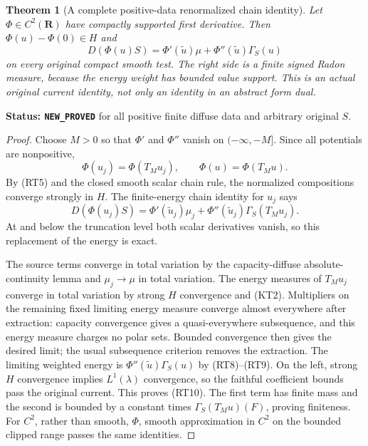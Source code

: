 \documentclass[11pt,a4paper]{article}
\numberwithin{equation}{section}
\newtheorem{theorem}{Theorem}[section]
\theoremstyle{definition}
\theoremstyle{remark}
\begin{document}
\begin{theorem}[A complete positive-data renormalized chain identity]
\label{thm:r11-positive-diffuse-renormalized-chain}
Let $\Phi\in C^2(\mathbf R)$ have compactly supported first
derivative.  Then $\Phi(u)-\Phi(0)\in H$ and
\[
 D(\Phi(u)S)
     =\Phi'(\widetilde u)\mu
                        +\Phi''(\widetilde u)\Gamma_S(u)
 \tag{RT10}
\]
on every original compact smooth test.  The right side is a
finite signed Radon measure, because the energy weight has
bounded value support.  This is an actual original current
identity, not only an identity in an abstract form dual.
\end{theorem}

\noindent\textbf{Status: \texttt{NEW\_PROVED}} for all positive
finite diffuse data and arbitrary original $S$.

\begin{proof}
Choose $M>0$ so that $\Phi'$ and $\Phi''$ vanish on
$(-\infty,-M]$.  Since all potentials are nonpositive,
\[
             \Phi(u_j)=\Phi(T_Mu_j),\qquad
             \Phi(u)=\Phi(T_Mu).
\]
By (RT5) and the closed smooth scalar chain rule, the
normalized compositions converge strongly in $H$.
The finite-energy chain identity for $u_j$ says
\[
 D(\Phi(u_j)S)=\Phi'(\widetilde u_j)\mu_j
                   +\Phi''(\widetilde u_j)\Gamma_S(T_Mu_j).
 \tag{RT11}
\]
At and below the truncation level both scalar derivatives
vanish, so this replacement of the energy is exact.

The source terms converge in total variation by the
capacity-diffuse absolute-continuity lemma and
$\mu_j\to\mu$ in total variation.  The energy measures of
$T_Mu_j$ converge in total variation by strong $H$ convergence
and (KT2).  Multipliers on the remaining fixed limiting
energy measure converge almost everywhere after extraction:
capacity convergence gives a quasi-everywhere subsequence,
and this energy measure charges no polar sets.  Bounded
convergence then gives the desired limit; the usual
subsequence criterion removes the extraction.  The limiting
weighted energy is $\Phi''(\widetilde u)\Gamma_S(u)$ by
(RT8)--(RT9).  On the left, strong $H$ convergence implies
$L^1(\lambda)$ convergence, so the faithful coefficient
bounds pass the original current.  This proves (RT10).
The first term has finite mass and the second is bounded by
a constant times $\Gamma_S(T_Mu)(F)$, proving finiteness.
For $C^2$, rather than smooth, $\Phi$, smooth approximation in
$C^2$ on the bounded clipped range passes the same identities.
\end{proof}
\end{document}

